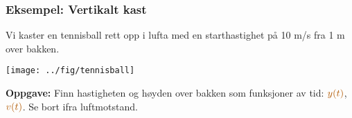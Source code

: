 \documentclass[english, 12pt]{beamer}
\newcommand{\alrt}{\color{AlertColor}}
\begin{document}
\begin{frame}
\frametitle{Eksempel: Vertikalt kast}

Vi kaster en tennisball rett opp i lufta med en starthastighet på 10 m/s fra 1 m over bakken.

\begin{center}
\texttt{[image: ../fig/tennisball]}
\end{center}

\textbf{Oppgave:} Finn hastigheten og høyden over bakken som funksjoner av tid: $\alrt y(t)$, $\alrt v(t)$. Se bort ifra luftmotstand.
\end{frame}

\begin{frame}

\end{frame}

\begin{frame}

\end{frame}
\end{document}
